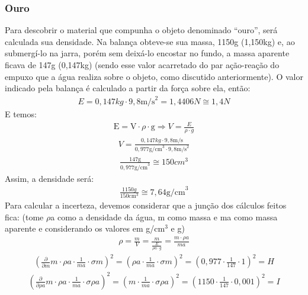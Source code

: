 \subsubsection{Ouro}
Para descobrir o material que compunha o objeto denominado ``ouro'', será calculada sua densidade. Na balança obteve-se sua massa, 1150g (1,150kg) e, ao submergí-lo na jarra, porém sem deixá-lo encostar no fundo, a massa aparente ficava de 147g (0,147kg) (sendo esse valor acarretado do par ação-reação do empuxo que a água realiza sobre o objeto, como discutido anteriormente). O valor indicado pela balança é calculado a partir da força sobre ela, então:
\begin{align*}
    E = 0,147kg \cdot 9,8 \mbox{m/s}^2 = 1,4406N \cong 1,4N
\end{align*}
E temos:
\begin{align*}
    \mbox{E} = \mbox{V} \cdot \rho \cdot \mbox{g} \Rightarrow V = \frac{E}{\rho \cdot g}
\end{align*}
\begin{align*}
    V = \frac{0,147kg \cdot 9,8\mbox{m/s}}{0,977 \mbox{g/cm}^3 \cdot 9,8\mbox{m/s}^2} 
\end{align*}
\begin{align*}
    \frac{147 \mbox{g}}{0,977 \mbox{g/cm}^3} \cong 150 cm^3
\end{align*}
Assim, a densidade será:
\begin{align*}
    \frac{1150g}{150\mbox{cm}^3} \cong 7,64 \mbox{g/cm}^3
\end{align*}
Para calcular a incerteza, devemos considerar que a junção dos cálculos feitos fica: (tome \(\rho\)a como a densidade da água, m como massa e ma como massa aparente e considerando os valores em g/cm\(^3\) e g)
\begin{align*}
    \rho = \frac{m}{V} = \frac{m}{\frac{E}{\rho a \cdot g}} = \frac{m \cdot \rho a}{ma} 
\end{align*}
\begin{align*}
\left( \frac{\partial }{\partial m}m\cdot\rho a \cdot \frac{1}{ma} \cdot \sigma m \right)^2 =\left(\rho a \cdot \frac{1}{ma} \cdot \sigma m \right)^2 = \left(0,977 \cdot \frac{1}{147} \cdot 1 \right)^2 = H
\end{align*}
\begin{align*}
    \left( \frac{\partial }{\partial \rho a}m\cdot\rho a \cdot \frac{1}{ma} \cdot \sigma \rho a \right)^2 =  \left(m\cdot \frac{1}{ma} \cdot \sigma \rho a \right)^2 = \left(1150\cdot \frac{1}{147} \cdot 0,001 \right)^2 = I
\end{align*}
